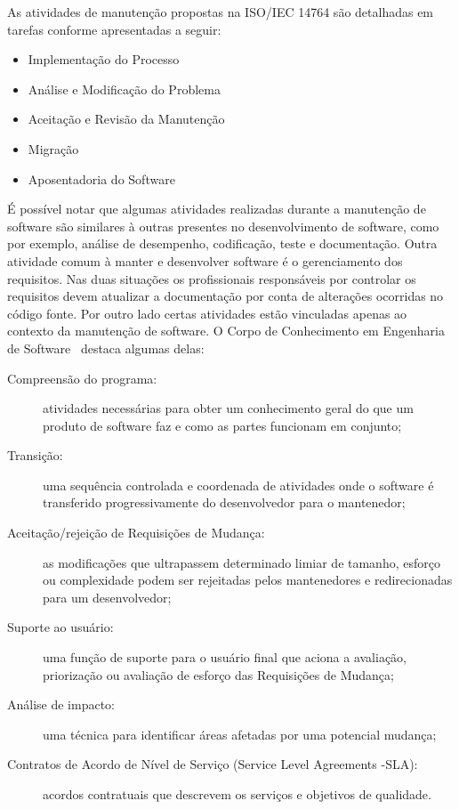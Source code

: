 As atividades de manutenção propostas na ISO/IEC 14764 são detalhadas em tarefas
conforme apresentadas a seguir:

\begin{itemize}
   	\item Implementação do Processo
   	\item Análise e Modificação do
		Problema
	\item Aceitação e Revisão da Manutenção
   	\item Migração
   	\item Aposentadoria do Software
\end{itemize}

É possível notar que algumas atividades realizadas durante a manutenção de
software são similares à outras presentes no desenvolvimento de software, como
por exemplo, análise de desempenho, codificação, teste e documentação. Outra
atividade comum à manter e desenvolver software é o gerenciamento dos
requisitos. Nas duas situações os profissionais responsáveis por controlar os
requisitos devem atualizar a do\-cu\-men\-ta\-ção  por conta de alterações
ocorridas no código fonte. Por outro lado certas atividades estão vinculadas
apenas ao contexto da manutenção de software. O Corpo de Conhecimento em
Engenharia de Software~\cite{4425813} destaca algumas delas:

\begin{description}
	\item[Compreensão do programa:] atividades necessárias para obter um
		conhecimento geral do que um produto de software faz e como as partes
		funcionam em conjunto;
	\item[Transição:] uma sequência controlada e coordenada de atividades onde o
		software é transferido progressivamente do desenvolvedor para o
		mantenedor;
	\item[Aceitação/rejeição de Requisições de Mudança:] as modificações
		que ultrapassem determinado limiar de tamanho, esforço ou complexidade
		podem ser rejeitadas pelos mantenedores e redirecionadas para um
		desenvolvedor;
	\item[Suporte ao usuário:] uma função de suporte para o usuário final que
		aciona a avaliação, priorização ou avaliação de esforço das Requisições
		de Mudança;
	\item[Análise de impacto:] uma técnica para identificar áreas afetadas por
		uma potencial mudança;
	\item[Contratos de Acordo de Nível de Serviço (Service Level Agreements
		\@-\@ SLA):] acordos contratuais que descrevem os serviços e objetivos
		de qualidade.
\end{description}
\todoend

